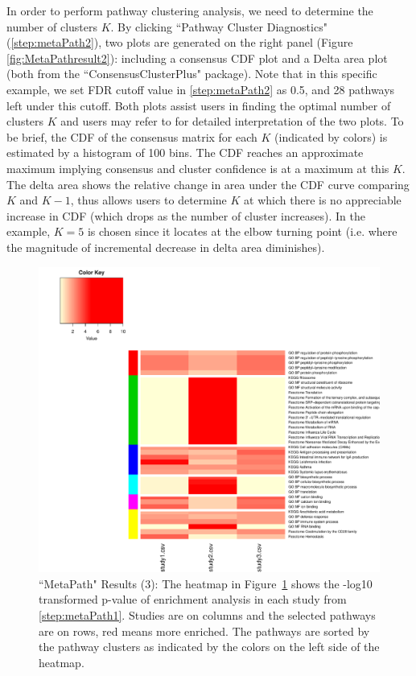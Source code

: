 In order to perform pathway clustering analysis, we need to determine the number of clusters $K$.
By clicking ``Pathway Cluster Diagnostics" (\ref{step:metaPath2}), 
two plots are generated on the right panel (Figure \ref{fig:MetaPathresult2}): 
including a consensus CDF plot and a Delta area plot (both from the ``ConsensusClusterPlus" package). 
Note that in this specific example, we set FDR cutoff value in \ref{step:metaPath2} as 0.5, and 28 pathways left under this cutoff.
Both plots assist users in finding the optimal number of clusters $K$ and users may refer to \cite{monti2003consensus} for detailed interpretation of the two plots. 
To be brief, the CDF of the consensus matrix for each $K$ (indicated by colors) is estimated by a histogram of 100 bins. 
The CDF reaches an approximate maximum implying consensus and cluster confidence is at a maximum at this $K$. 
The delta area shows the relative change in area under the CDF curve comparing $K$ and $K - 1$, thus allows users to determine $K$ at which there is no appreciable increase in CDF (which drops as the number of cluster increases).
In the example, $K=5$ is chosen since it locates at the elbow turning point (i.e. where the magnitude of incremental decrease in delta area diminishes).

\begin{figure}[H]
\begin{center}
\includegraphics[scale=0.6]{./figure/metaPath/Heatmap_clusters_all.pdf}
\caption{``MetaPath" Results (3):
The heatmap in Figure~\ref{fig:MetaPathresult3} shows the -log10 transformed p-value of enrichment analysis in each study from \ref{step:metaPath1}. 
Studies are on columns and the selected pathways are on rows, red means more enriched. The pathways are sorted by the pathway clusters as indicated by the colors on the left side of the heatmap.}
\label{fig:MetaPathresult3}
\end{center}
\end{figure}


